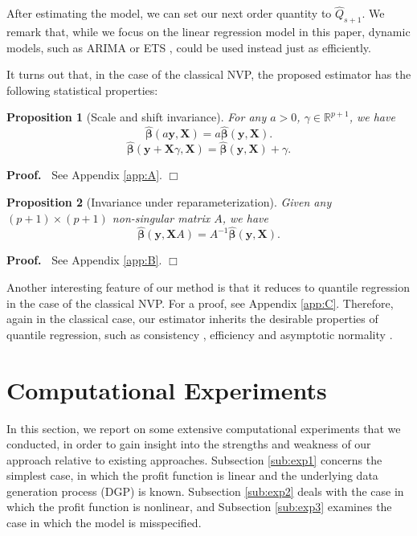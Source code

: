 \documentclass{article}
\newtheorem{proposition}{Proposition}
\newenvironment{proof}
 {\begin{trivlist} \item[] {\bf Proof.\ }}{\hfill$\Box$ \end{trivlist}}
\begin{document}
After estimating the model, we can set our next order quantity to $\hat{Q}_{s+1}$. We remark that, while we focus on the linear regression model in this paper, dynamic models, such as ARIMA or ETS \cite{HKO08}, could be used instead just as efficiently. 

It turns out that, in the case of the classical NVP, the proposed estimator has the following statistical properties:
\begin{proposition}[Scale and shift invariance]
For any $a>0$, $\gamma\in \mathbb{R}^{p+1}$, we have
\[
    \hat{\boldsymbol{\beta}}(a\mathbf{y},\mathbf{X})=a\hat{\boldsymbol{\beta}}(\mathbf{y},\mathbf{X}).
\]
\[
    \hat{\boldsymbol{\beta}}(\mathbf{y}+\mathbf{X}\gamma,\mathbf{X})=
    \hat{\boldsymbol{\beta}}(\mathbf{y},\mathbf{X})+\gamma.
\]
\end{proposition}
\begin{proof}
See Appendix \ref{app:A}.
\end{proof}

\begin{proposition}[Invariance under reparameterization]
Given any $(p+1)\times (p+1)$ non-singular matrix $A$, we have
\[
        \hat{\boldsymbol{\beta}}(\mathbf{y},\mathbf{X}A)=A^{-1}\hat{\boldsymbol{\beta}}(\mathbf{y},\mathbf{X}).
\]
\end{proposition}
\begin{proof}
See Appendix \ref{app:B}.
\end{proof}

Another interesting feature of our method is that it reduces to quantile regression in the case of the classical NVP. For a proof, see Appendix \ref{app:C}. Therefore, again in the classical case, our estimator
inherits the desirable properties of quantile regression, such as
consistency \cite{Koe05}, efficiency \cite{KM99} and asymptotic
normality \cite{KHM05}.

\section{Computational Experiments} \label{se:results}

In this section, we report on some extensive computational experiments
that we conducted, in order to gain insight into the strengths and weakness of our approach relative to existing approaches. Subsection \ref{sub:exp1}
concerns the simplest case, in which the profit function is linear and the
underlying data generation process (DGP) is known. Subsection \ref{sub:exp2}
deals with the case in which the profit function is nonlinear, and Subsection \ref{sub:exp3} examines the case in which the model is misspecified.
\end{document}
